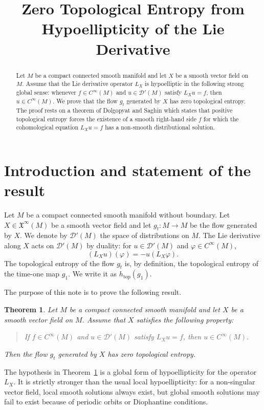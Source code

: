 \documentclass[11pt]{article}
\title{Zero Topological Entropy from Hypoellipticity of the Lie Derivative}
\author{}
\date{}
\newtheorem{theorem}{Theorem}[section]
\begin{document}
\maketitle

\begin{abstract}
Let \(M\) be a compact connected smooth manifold and let \(X\) be a smooth vector field on \(M\). Assume that the Lie derivative operator \(L_X\) is hypoelliptic in the following strong global sense: whenever \(f\in C^\infty(M)\) and \(u\in \mathcal D'(M)\) satisfy \(L_X u=f\), then \(u\in C^\infty(M)\). We prove that the flow \(g_t\) generated by \(X\) has zero topological entropy. The proof rests on a theorem of Dolgopyat and Saghin which states that positive topological entropy forces the existence of a smooth right-hand side \(f\) for which the cohomological equation \(L_Xu=f\) has a non-smooth distributional solution.
\end{abstract}

\section{Introduction and statement of the result}

Let \(M\) be a compact connected smooth manifold without boundary. Let \(X\in \mathfrak X^\infty(M)\) be a smooth vector field and let \(g_t\colon M\to M\) be the flow generated by \(X\). We denote by \(\mathcal D'(M)\) the space of distributions on \(M\). The Lie derivative along \(X\) acts on \(\mathcal D'(M)\) by duality: for \(u\in\mathcal D'(M)\) and \(\varphi\in C^\infty(M)\),
\[
(L_X u)(\varphi) = -u(L_X\varphi).
\]
The topological entropy of the flow \(g_t\) is, by definition, the topological entropy of the time-one map \(g_1\). We write it as \(h_{\mathrm{top}}(g_1)\).

The purpose of this note is to prove the following result.

\begin{theorem}\label{thm:main}
Let \(M\) be a compact connected smooth manifold and let \(X\) be a smooth vector field on \(M\). Assume that \(X\) satisfies the following property:
\begin{quote}
If \(f\in C^\infty(M)\) and \(u\in\mathcal D'(M)\) satisfy \(L_X u=f\), then \(u\in C^\infty(M)\).
\end{quote}
Then the flow \(g_t\) generated by \(X\) has zero topological entropy.
\end{theorem}

The hypothesis in Theorem~\ref{thm:main} is a global form of hypoellipticity for the operator \(L_X\). It is strictly stronger than the usual local hypoellipticity: for a non-singular vector field, local smooth solutions always exist, but global smooth solutions may fail to exist because of periodic orbits or Diophantine conditions.
\end{document}

